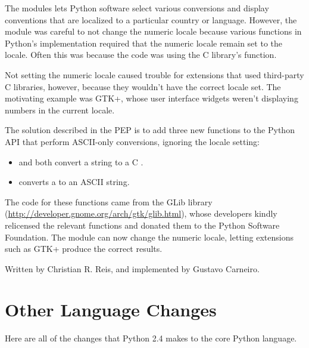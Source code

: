 \documentclass{howto}
\begin{document}
The  modules lets Python software select various
conversions and display conventions that are localized to a particular
country or language.  However, the module was careful to not change
the numeric locale because various functions in Python's
implementation required that the numeric locale remain set to the
 locale.  Often this was because the code was using the C library's
 function.  

Not setting the numeric locale caused trouble for extensions that used
third-party C libraries, however, because they wouldn't have the
correct locale set.  The motivating example was GTK+, whose user
interface widgets weren't displaying numbers in the current locale.

The solution described in the PEP is to add three new functions to the
Python API that perform ASCII-only conversions, ignoring the locale
setting:

\begin{itemize}
 \item {} 
and  
both convert a string to a C .
 \item {} converts a  to an ASCII string.
\end{itemize}

The code for these functions came from the GLib library
(\url{http://developer.gnome.org/arch/gtk/glib.html}), whose
developers kindly relicensed the relevant functions and donated them
to the Python Software Foundation.  The  module 
can now change the numeric locale, letting extensions such as GTK+ 
produce the correct results.

\begin{seealso}
{Written by Christian R. Reis, and implemented by Gustavo Carneiro.}
\end{seealso}      

\section{Other Language Changes}

Here are all of the changes that Python 2.4 makes to the core Python
language.
\end{document}
